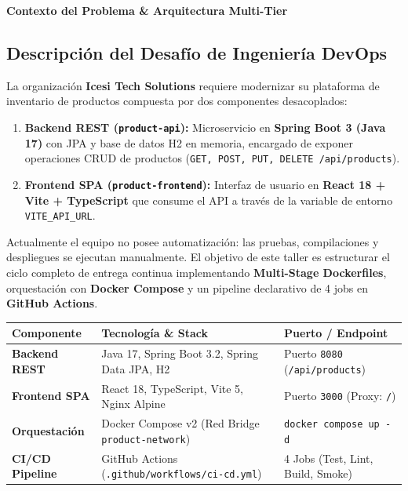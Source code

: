 \documentclass[10pt,letterpaper]{article}
\newcommand{\sectionBadge}[1]{%
  \refstepcounter{section}%
  \vspace{0.24cm}%
  \noindent%
  \colorbox{icesiBlue}{\color{white}\rule[-0.08cm]{0pt}{0.42cm}\hspace{0.16cm}\textbf{\normalsize \thesection}\hspace{0.16cm}}%
  \hspace{0.18cm}%
  {\fontsize{9.5}{12}\selectfont\textbf{\color{icesiDark}#1}}\\[-0.10cm]%
  \noindent{\color{icesiDark}\rule{\textwidth}{0.8pt}}\vspace{0.10cm}%
}
\begin{document}
\vspace{0.12cm}

\sectionBadge{Contexto del Problema \& Arquitectura Multi-Tier}

\subsection{Descripción del Desafío de Ingeniería DevOps}
La organización \textbf{Icesi Tech Solutions} requiere modernizar su plataforma de inventario de productos compuesta por dos componentes desacoplados:
\begin{enumerate}[leftmargin=*,itemsep=1.5pt,topsep=1.5pt]
  \item \textbf{Backend REST (\texttt{product-api}):} Microservicio en \textbf{Spring Boot 3 (Java 17)} con JPA y base de datos H2 en memoria, encargado de exponer operaciones CRUD de productos (\texttt{GET, POST, PUT, DELETE /api/products}).
  \item \textbf{Frontend SPA (\texttt{product-frontend}):} Interfaz de usuario en \textbf{React 18 + Vite + TypeScript} que consume el API a través de la variable de entorno \texttt{VITE\_API\_URL}.
\end{enumerate}

Actualmente el equipo no posee automatización: las pruebas, compilaciones y despliegues se ejecutan manualmente. El objetivo de este taller es estructurar el ciclo completo de entrega continua implementando \textbf{Multi-Stage Dockerfiles}, orquestación con \textbf{Docker Compose} y un pipeline declarativo de 4 jobs en \textbf{GitHub Actions}.

\vspace{0.08cm}
\noindent
\small
\begin{tabularx}{\textwidth}{|L{2.8cm}|X|L{3.5cm}|}
\hline
{}
\textbf{Componente} & \textbf{Tecnología \& Stack} & \textbf{Puerto / Endpoint} \\ \hline
\textbf{Backend REST} & Java 17, Spring Boot 3.2, Spring Data JPA, H2 & Puerto \texttt{8080} (\texttt{/api/products}) \\ \hline
\textbf{Frontend SPA} & React 18, TypeScript, Vite 5, Nginx Alpine & Puerto \texttt{3000} (Proxy: \texttt{/}) \\ \hline
\textbf{Orquestación} & Docker Compose v2 (Red Bridge \texttt{product-network}) & \texttt{docker compose up -d} \\ \hline
\textbf{CI/CD Pipeline} & GitHub Actions (\texttt{.github/workflows/ci-cd.yml}) & 4 Jobs (Test, Lint, Build, Smoke) \\ \hline
\end{tabularx}
\end{document}
